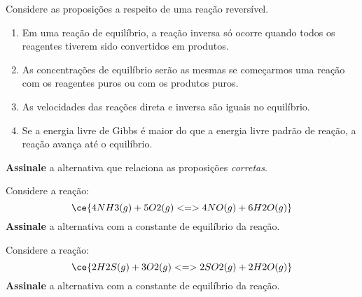 \begin{problem}[
	id={2F02},
	path={/home/braun/Documents/Developer/braunchem/data/problems/Q2/2F/2F02}
]
Considere as proposições a respeito de uma reação reversível.

\begin{enumerate}
\def\labelenumi{\arabic{enumi}.}
\tightlist
\item
  Em uma reação de equilíbrio, a reação inversa só ocorre quando todos os reagentes tiverem sido convertidos em produtos.
\item
  As concentrações de equilíbrio serão as mesmas se começarmos uma reação com os reagentes puros ou com os produtos puros.
\item
  As velocidades das reações direta e inversa são iguais no equilíbrio.
\item
  Se a energia livre de Gibbs é maior do que a energia livre padrão de reação, a reação avança até o equilíbrio.
\end{enumerate}

\textbf{Assinale} a alternativa que relaciona as proposições \emph{corretas}.
\end{problem}


\begin{problem}[
	id={2F03},
	path={/home/braun/Documents/Developer/braunchem/data/problems/Q2/2F/2F03}
]
Considere a reação: {\[
    \ce{ 4 NH3(g) + 5 O2(g) <=> 4 NO(g) + 6 H2O(g) }
\]} \textbf{Assinale} a alternativa com a constante de equilíbrio da reação.
\end{problem}


\begin{problem}[
	id={2F04},
	path={/home/braun/Documents/Developer/braunchem/data/problems/Q2/2F/2F04}
]
Considere a reação: {\[
    \ce{ 2 H2S(g) + 3 O2(g) <=> 2 SO2(g) + 2 H2O(g) }
\]} \textbf{Assinale} a alternativa com a constante de equilíbrio da reação.
\end{problem}


